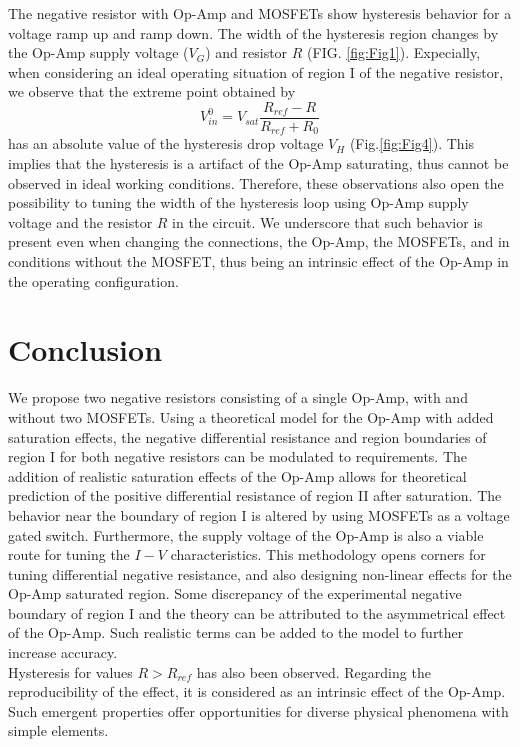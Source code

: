 \documentclass[%
 aip,
amsmath,amssymb,
reprint,
]{revtex4-1}
\begin{document}
The negative resistor with Op-Amp and MOSFETs show hysteresis behavior for a voltage ramp up and ramp down. The width of the hysteresis region changes by the Op-Amp supply voltage ($V_G$) and resistor $R$ (FIG. \ref{fig:Fig1}). Expecially, when considering an ideal operating situation of region I of the negative resistor, we observe that the extreme point obtained by 
\begin{equation}
    V_{in}^0 = V_{sat}\frac{R_{ref}-R}{R_{ref}+R_0}
\end{equation}
has an absolute value of the hysteresis drop voltage $V_H$ (Fig.\ref{fig:Fig4}). This implies that the hysteresis is a artifact of the Op-Amp saturating, thus cannot be observed in ideal working conditions. Therefore, these observations also open the possibility to tuning the width of the hysteresis loop using Op-Amp supply voltage and the resistor $R$ in the circuit. We underscore that such behavior is present even when changing the connections, the Op-Amp, the MOSFETs, and in conditions without the MOSFET, thus being an intrinsic effect of the Op-Amp in the operating configuration. 




\section{\label{sec:Conclusion} Conclusion}
We propose two negative resistors consisting of a single Op-Amp, with and without two MOSFETs. Using a theoretical model for the Op-Amp with added saturation effects, the negative differential resistance and region boundaries of region I for both negative resistors can be modulated to requirements. The addition of realistic saturation effects of the Op-Amp allows for theoretical prediction of the positive differential resistance of region II after saturation. The behavior near the boundary of region I is altered by using MOSFETs as a voltage gated switch. Furthermore, the supply voltage of the Op-Amp is also a viable route for tuning the $I-V$ characteristics. This methodology opens corners for tuning differential negative resistance, and also designing non-linear effects for the Op-Amp saturated region. Some discrepancy of the experimental negative boundary of region I and the theory can be attributed to the asymmetrical effect of the Op-Amp. Such realistic terms can be added to the model to further increase accuracy.\\

Hysteresis for values $R>R_{ref}$ has also been observed. Regarding the reproducibility of the effect, it is considered as an intrinsic effect of the Op-Amp. Such emergent properties offer opportunities for diverse physical phenomena with simple elements. \\
\end{document}
